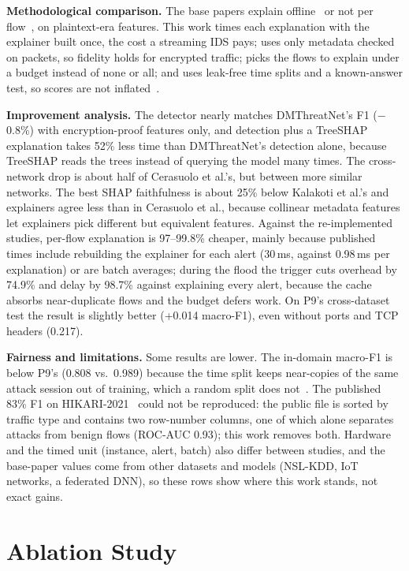 \documentclass[pdflatex,iicol,sn-mathphys-num]{sn-jnl}
\begin{document}
\textbf{Methodological comparison.} The base papers explain offline~\cite{kalakoti2026,cerasuolo2026} or not per flow~\cite{dmthreatnet2026}, on plaintext-era features. This work times each explanation with the explainer built once, the cost a streaming IDS pays; uses only metadata checked on packets, so fidelity holds for encrypted traffic; picks the flows to explain under a budget instead of none or all; and uses leak-free time splits and a known-answer test, so scores are not inflated~\cite{arp2022}.

\textbf{Improvement analysis.} The detector nearly matches DMThreatNet's F1 ($-$0.8\%) with encryption-proof features only, and detection plus a TreeSHAP explanation takes 52\% less time than DMThreatNet's detection alone, because TreeSHAP reads the trees instead of querying the model many times. The cross-network drop is about half of Cerasuolo et al.'s, but between more similar networks. The best SHAP faithfulness is about 25\% below Kalakoti et al.'s and explainers agree less than in Cerasuolo et al., because collinear metadata features let explainers pick different but equivalent features. Against the re-implemented studies, per-flow explanation is 97--99.8\% cheaper, mainly because published times include rebuilding the explainer for each alert (30\,ms, against 0.98\,ms per explanation) or are batch averages; during the flood the trigger cuts overhead by 74.9\% and delay by 98.7\% against explaining every alert, because the cache absorbs near-duplicate flows and the budget defers work. On P9's cross-dataset test the result is slightly better (+0.014 macro-F1), even without ports and TCP headers (0.217).

\textbf{Fairness and limitations.} Some results are lower. The in-domain macro-F1 is below P9's (0.808 vs.\ 0.989) because the time split keeps near-copies of the same attack session out of training, which a random split does not~\cite{arp2022}. The published 83\% F1 on HIKARI-2021~\cite{vitorino2024} could not be reproduced: the public file is sorted by traffic type and contains two row-number columns, one of which alone separates attacks from benign flows (ROC-AUC 0.93); this work removes both. Hardware and the timed unit (instance, alert, batch) also differ between studies, and the base-paper values come from other datasets and models (NSL-KDD, IoT networks, a federated DNN), so these rows show where this work stands, not exact gains.

\section{Ablation Study}\label{sec:ablation}
\end{document}
